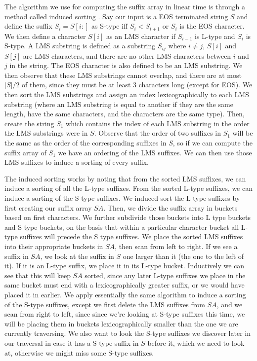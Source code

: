 \documentclass[a4paper]{article}
\begin{document}
\begin{multicols}{2}
The algorithm we use for computing the suffix array in linear time is through a method called induced sorting \cite{5582081}. Say our input is a EOS terminated string $S$ and define the suffix $S_i = S[i:]$ as S-type iff $S_i < S_{i+1}$ or $S_i$ is the EOS character. We then define a character $S[i]$ as an LMS character if $S_{i-1}$ is L-type and $S_i$ is S-type. A LMS substring is defined as a substring $S_{ij}$ where $i \neq j$, $S[i]$ and $S[j]$ are LMS characters, and there are no other LMS characters between $i$ and $j$ in the string. The EOS character is also defined to be an LMS substring. We then observe that these LMS substrings cannot overlap, and there are at most $|S|/2$ of them, since they must be at least 3 characters long (except for EOS). We then sort the LMS substrings and assign an index lexicographically to each LMS substring (where an LMS substring is equal to another if they are the same length, have the same characters, and the characters are the same type). Then, create the string $S_1$ which contains the index of each LMS substring in the order the LMS substrings were in $S$. Observe that the order of two suffixes in $S_1$ will be the same as the order of the corresponding suffixes in $S$, so if we can compute the suffix array of $S_1$ we have an ordering of the LMS suffixes. We can then use those LMS suffixes to induce a sorting of every suffix.

The induced sorting works by noting that from the sorted LMS suffixes, we can induce a sorting of all the L-type suffixes. From the sorted L-type suffixes, we can induce a sorting of the S-type suffixes. We induced sort the L-type suffixes by first creating our suffix array $SA$. Then, we divide the suffix array in buckets based on first characters. We further subdivide those buckets into L type buckets and S type buckets, on the basis that within a particular character bucket all L-type suffixes will precede the S type suffixes. We place the sorted LMS suffixes into their appropriate buckets in $SA$, then scan from left to right. If we see a suffix in $SA$, we look at the suffix in $S$ one larger than it (the one to the left of it). If it is an L-type suffix, we place it in its L-type bucket. Inductively we can see that this will keep $SA$ sorted, since any later L-type suffixes we place in the same bucket must end with a lexicographically greater suffix, or we would have placed it in earlier. We apply essentially the same algorithm to induce a sorting of the S-type suffixes, except we first delete the LMS suffixes from $SA$, and we scan from right to left, since since we're looking at S-type suffixes this time, we will be placing them in buckets lexicographically smaller than the one we are currently traversing. We also want to look the S-type suffixes we discover later in our traversal in case it has a S-type suffix in $S$ before it, which we need to look at, otherwise we might miss some S-type suffixes.


\end{multicols}
\end{document}
